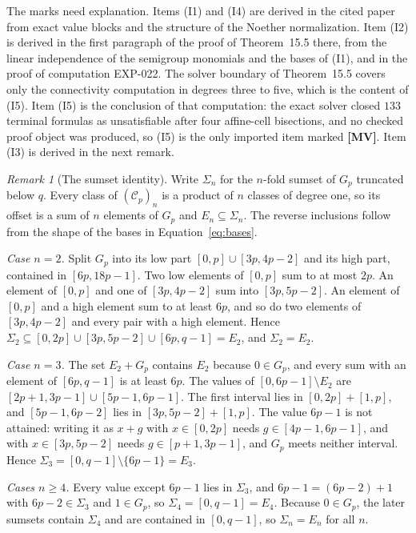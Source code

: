 \documentclass[11pt]{article}
\theoremstyle{definition}
\theoremstyle{remark}
\newtheorem{remark}[theorem]{Remark}
\newcommand{\Cfiber}{\mathcal{C}}
\newcommand{\mMV}{\textbf{[MV]}}
\begin{document}
The marks need explanation. Items (I1) and (I4) are derived in the cited paper from exact value
blocks and the structure of the Noether normalization. Item (I2) is derived in the first
paragraph of the proof of Theorem~15.5 there, from the linear independence of the semigroup
monomials and the bases of (I1), and in the proof of computation EXP-022. The solver boundary of Theorem~15.5 covers only the
connectivity computation in degrees three to five, which is the content of (I5).
Item (I5) is the conclusion of that computation: the exact solver closed $133$ terminal formulas
as unsatisfiable after four affine-cell bisections, and no checked proof object was produced, so
(I5) is the only imported item marked \mMV{}. Item (I3) is derived in the next remark.

\begin{remark}[The sumset identity]\label{rem:sumset}
Write $\Sigma_n$ for the $n$-fold sumset of $G_p$ truncated below $q$. Every class of $(\Cfiber_p)_n$
is a product of $n$ classes of degree one, so its offset is a sum of $n$ elements of $G_p$ and
$E_n\subseteq\Sigma_n$. The reverse inclusions follow from the shape of the bases in
Equation~\eqref{eq:bases}.

\emph{Case $n=2$.} Split $G_p$ into its low part $[0,p]\cup[3p,4p-2]$ and its high part, contained
in $[6p,18p-1]$. Two low elements of $[0,p]$ sum to at most $2p$. An element of $[0,p]$ and one of
$[3p,4p-2]$ sum into $[3p,5p-2]$. An element of $[0,p]$ and a high element sum to at least $6p$,
and so do two elements of $[3p,4p-2]$ and every pair with a high element. Hence
$\Sigma_2\subseteq[0,2p]\cup[3p,5p-2]\cup[6p,q-1]=E_2$, and $\Sigma_2=E_2$.

\emph{Case $n=3$.} The set $E_2+G_p$ contains $E_2$ because $0\in G_p$, and every sum with an
element of $[6p,q-1]$ is at least $6p$. The values of $[0,6p-1]\setminus E_2$ are
$[2p+1,3p-1]\cup[5p-1,6p-1]$. The first interval lies in $[0,2p]+[1,p]$, and
$[5p-1,6p-2]$ lies in $[3p,5p-2]+[1,p]$. The value $6p-1$ is not attained: writing it as $x+g$
with $x\in[0,2p]$ needs $g\in[4p-1,6p-1]$, and with $x\in[3p,5p-2]$ needs $g\in[p+1,3p-1]$, and
$G_p$ meets neither interval. Hence $\Sigma_3=[0,q-1]\setminus\{6p-1\}=E_3$.

\emph{Cases $n\geq4$.} Every value except $6p-1$ lies in $\Sigma_3$, and $6p-1=(6p-2)+1$ with
$6p-2\in \Sigma_3$ and $1\in G_p$, so $\Sigma_4=[0,q-1]=E_4$. Because $0\in G_p$, the later sumsets contain
$\Sigma_4$ and are contained in $[0,q-1]$, so $\Sigma_n=E_n$ for all $n$.
\end{remark}
\end{document}
